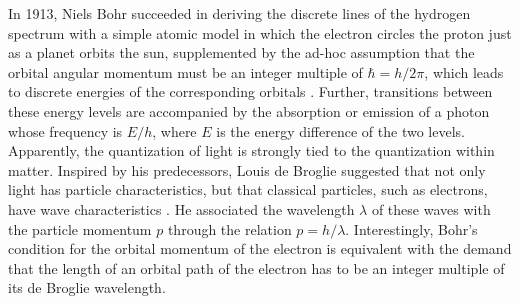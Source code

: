 \documentclass[preprint,footinbib,preprintnumbers,amsmath,amssymb,prb,12pt]{revtex4}
\begin{document}
In 1913, Niels Bohr succeeded in deriving the discrete lines of the
hydrogen spectrum with a simple atomic model in which the electron
circles the proton just as a planet orbits the sun, supplemented by
the ad-hoc assumption that the orbital angular momentum must be an
integer multiple of $\hbar=h/2\pi$, which leads to discrete
energies of the corresponding orbitals \cite{bohr}. Further,
transitions between these energy levels are accompanied by the
absorption or emission of a photon whose frequency is $E/h$,
where $E$ is the energy difference of the two levels. Apparently, the
quantization of light is strongly tied to the quantization within
matter. Inspired by his predecessors, Louis de Broglie suggested
that not only light has particle characteristics, but that classical
particles, such as electrons, have wave characteristics \cite{broglie}. He associated the wavelength $\lambda$ of these
waves with the particle momentum $p$ through the relation
$p=h/\lambda$. Interestingly, Bohr's condition for the
orbital momentum of the electron is equivalent with the demand that
the length of an orbital path of the electron has to be an
integer multiple of its de Broglie wavelength.
\end{document}
